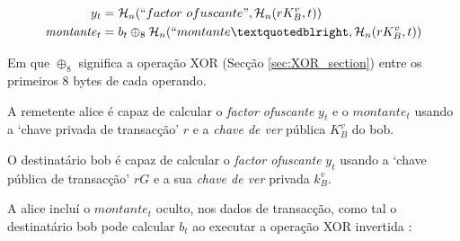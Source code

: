 
\vspace{.175cm}%
\begin{align*}
  y_t &= \mathcal{H}_n(``factor\ ofuscante",\mathcal{H}_n(r K_B^v, t)) \\
  \mathit{montante}_t &= b_t \oplus_8 \mathcal{H}_n(``montante”, \mathcal{H}_n(r K_B^v, t))
\end{align*}

Em que $\oplus_8$ significa a operação XOR (Secção \ref{sec:XOR_section}) entre os primeiros 8 bytes de cada operando.\newline

A remetente alice é capaz de calcular o {\em factor ofuscante} $y_t$ e o $montante_t$ usando a `chave privada de transacção' $r$ e a {\em chave de ver} pública $K_B^v$ do bob. 

O destinatário bob é capaz de calcular o {\em factor ofuscante} $y_t$ usando a `chave pública de transacção' $r G$ e a sua {\em chave de ver} privada $k_B^v$. 

A alice incluí o $\mathit{montante}_t$ oculto, nos dados de transacção, como tal o destinatário bob pode calcular $b_t$ ao executar a operação XOR invertida :

